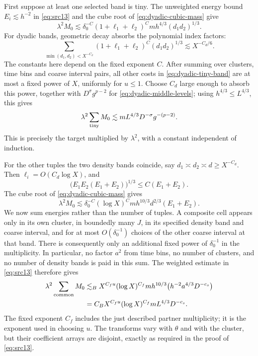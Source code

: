 First suppose at least one selected band is tiny.  The unweighted
energy bound $E_i\lesssim h^{-2}$ in \eqref{eq:src13} and the cube
root of \eqref{eq:dyadic-cubic-mass} give
\begin{equation}\label{eq:dyadic-tiny-band}
 \lambda^2M_0\lesssim
 \delta_0^{-C}(1+\ell_1+\ell_2)^C
 mh^{4/3}(d_1d_2)^{1/3}.
\end{equation}
For dyadic bands, geometric decay absorbs the polynomial index factors:
\[
 \sum_{\min(d_1,d_2)<X^{-C_d}}
 (1+\ell_1+\ell_2)^C(d_1d_2)^{1/3}
 \lesssim X^{-C_d/6}.
\]
The constants here depend on the fixed exponent $C$.  After summing
over clusters, time bins and coarse interval pairs, all other costs in
\eqref{eq:dyadic-tiny-band} are at most a fixed power of $X$, uniformly
for $u\leq1$.  Choose $C_d$ large enough to absorb this power, together
with $D^\sigma g^{p-2}$ for
\eqref{eq:dyadic-middle-levels}; using $h^{4/3}\leq L^{4/3}$, this
gives
\[
 \lambda^2\sum_{\rm tiny}M_0
 \lesssim mL^{4/3}D^{-\sigma}g^{-(p-2)}.
\]
This is precisely the target multiplied by $\lambda^2$, with a constant
independent of induction.

For the other tuples the two density bands coincide, say $d_1\asymp
d_2\asymp d\geq X^{-C_d}$.  Then $\ell_i=O(C_d\log X)$, and
\[
 \big(E_1E_2(E_1+E_2)\big)^{1/3}\leq C(E_1+E_2).
\]
The cube root of \eqref{eq:dyadic-cubic-mass} gives
\begin{equation}\label{eq:dyadic-common-band}
 \lambda^2M_0\lesssim
 \delta_0^{-C}(\log X)^C
 mh^{10/3}d^{2/3}(E_1+E_2).
\end{equation}
We now sum energies rather than the number of tuples.  A composite
cell appears only in its own cluster, in boundedly many $J$, in its
specified density band and coarse interval, and for at most
$O(\delta_0^{-1})$ choices of the other coarse interval at that band.
There is consequently only an additional fixed power of
$\delta_0^{-1}$ in the multiplicity.  In particular, no factor $a^2$
from time bins, no number of clusters, and no number of density bands
is paid in this sum.  The weighted estimate in \eqref{eq:src13}
therefore gives
\begin{align}
 \lambda^2\sum_{\rm common}M_0
 &\lesssim_B
 X^{C_fu}(\log X)^{C_f}mh^{10/3}
       \big(h^{-2}a^{4/3}D^{-c_s}\big)\notag\\
 &=C_BX^{C_fu}(\log X)^{C_f}
       mL^{4/3}D^{-c_s}.
 \label{eq:dyadic-final-energy}
\end{align}
The fixed exponent $C_f$ includes the just described partner
multiplicity; it is the exponent used in choosing $u$.  The transforms
vary with $\theta$ and with the cluster, but their coefficient arrays
are disjoint, exactly as required in the proof of
\eqref{eq:src13}.

